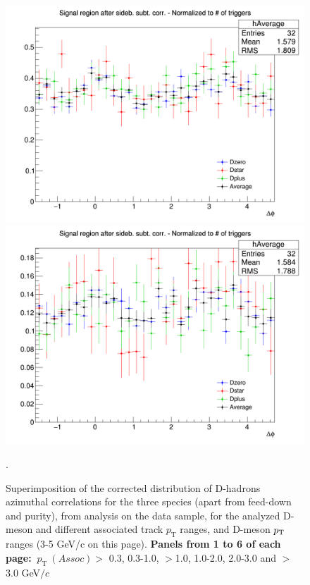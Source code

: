 \begin{figure}[!htbp]
{\includegraphics[width=0.48\linewidth]{figures/Averages/AzimCorrDistr_Canvas_PtIntBins3to5_PoolInt_thr2dotto3dot_Superimp.png}}
{\includegraphics[width=0.48\linewidth]{figures/Averages/AzimCorrDistr_Canvas_PtIntBins3to5_PoolInt_thr3dotto99dot_Superimp.png}}
\caption{Superimposition of the corrected distribution of D-hadrons azimuthal correlations for the three species (apart from feed-down and purity), from analysis on the data sample, for the analyzed D-meson and different associated track $p_\text{T}$ ranges, and D-meson $p_{\rm T}$ ranges (3-5 GeV/c on this page). \textbf{Panels from 1 to 6 of each page:} $ \ p_\text{T}~(Assoc)>$ 0.3, 0.3-1.0, $>$1.0, 1.0-2.0, 2.0-3.0 and $>$3.0 GeV$/c$}.
\label{fig:Data_Res_D0DpDs}
\end{figure}
\newpage
